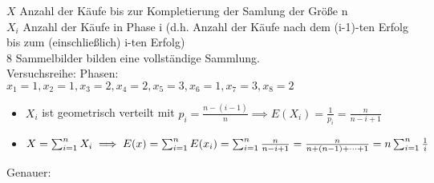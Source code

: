 \documentclass{../tudscript}
\begin{document}
  $X$ Anzahl der Käufe bis zur Kompletierung der Samlung der Größe n \\
  $X_i$ Anzahl der Käufe in Phase i (d.h. Anzahl der Käufe nach dem (i-1)-ten
  Erfolg bis zum (einschließlich) i-ten Erfolg)\\
  8 Sammelbilder bilden eine vollständige Sammlung. \\
  Versuchsreihe:
  Phasen:\\
  $x_1= 1, x_2 = 1 , x_3 = 2, x_4 = 2, x_5 = 3, x_6=1,x_7=3,x_8=2$
  \begin{itemize}
  \item $X_i$ ist geometrisch verteilt mit $ p_i = \frac{n-(i-1)}{n} \implies E(X_i) =  \frac{1}{p_i} = \frac{n}{n-i+1}$
  \item$ X = \sum_{i=1}^{n} X_i \\
    \implies E(x) = \sum_{i=1}^{n} E(x_i) = \sum_{i=1}^{n} \frac{n}{n-i+1} \\
    = \frac{n}{n+(n-1)+\cdots+ 1} = n \sum_{i=1}^{n} \frac{1}{i}$
    
  \end{itemize}
 Genauer:
\end{document}
